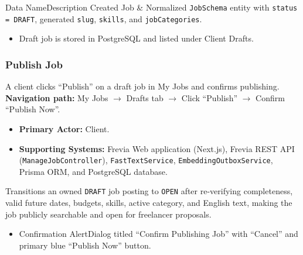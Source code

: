 \begin{specdatatable}{Data Name}{Description}
Created Job & Normalized \texttt{JobSchema} entity with \texttt{status = DRAFT}, generated \texttt{slug}, \texttt{skills}, and \texttt{jobCategories}.\\ \hline
\end{specdatatable}

\begin{itemize}[leftmargin=1.6em,topsep=3pt,itemsep=2pt,parsep=0pt,label=$\bullet$]
    \item Draft job is stored in PostgreSQL and listed under Client Drafts.
\end{itemize}

\subsubsection{Publish Job}

A client clicks ``Publish'' on a draft job in My Jobs and confirms publishing.\newline
\textbf{Navigation path:} My Jobs $\rightarrow$ Drafts tab $\rightarrow$ Click ``Publish'' $\rightarrow$ Confirm ``Publish Now''.


\begin{itemize}[leftmargin=1.6em,topsep=3pt,itemsep=2pt,parsep=0pt,label=$\bullet$]
    \item \textbf{Primary Actor:} Client.
    \item \textbf{Supporting Systems:} Frevia Web application (Next.js), Frevia REST API (\texttt{ManageJobController}), \texttt{FastTextService}, \texttt{EmbeddingOutboxService}, Prisma ORM, and PostgreSQL database.
\end{itemize}

\noindent Transitions an owned \texttt{DRAFT} job posting to \texttt{OPEN} after re-verifying completeness, valid future dates, budgets, skills, active category, and English text, making the job publicly searchable and open for freelancer proposals.

\begin{itemize}[leftmargin=1.6em,topsep=3pt,itemsep=2pt,parsep=0pt,label=$\bullet$]
    \item Confirmation AlertDialog titled ``Confirm Publishing Job'' with ``Cancel'' and primary blue ``Publish Now'' button.
\end{itemize}

